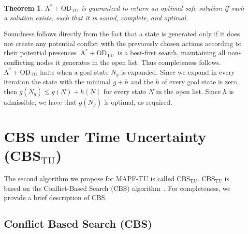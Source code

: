 \documentclass[jair,twoside,11pt,theapa]{article}
\newcommand{\odatu}{$\mathrm{A^{*}+OD_{TU}}$\xspace}
\newcommand{\cbstu}{CBS$\mathrm{_{TU}}$\xspace}
\newcommand{\mapftu}{MAPF-TU\xspace}
\newtheorem{theorem}{Theorem}
\newenvironment{proofo}{\renewcommand{\proofname}{Proof outline}\proof}{\endproof}
\begin{document}
\begin{theorem}
\odatu is guaranteed to return an optimal safe solution if such a solution exists, such that it is sound, complete, and optimal. 
\label{the:aod}
\end{theorem}
\begin{proofo}
Soundness follows directly from the fact that a state is generated only if it does not create any potential conflict with the previously chosen actions according to their potential presences. 
\odatu\ is a best-first search, maintaining all non-conflicting nodes it generates in the open list. Thus completeness follows.
\odatu halts when a goal state $N_g$ is expanded. 
Since we expand in every iteration the state with the minimal $g+h$ and 
the $h$ of every goal state is zero, 
then $g(N_g)\leq g(N)+h(N)$ for every state $N$ in the open list. 
Since $h$ is admissible, 
we have that $g(N_g)$ is optimal, as required. %
\end{proofo}


\section{CBS under Time Uncertainty (\cbstu)}
\label{cbstu}

The second algorithm we propose for \mapftu is called \cbstu. 
\cbstu is based on the Conflict-Based Search (CBS) algorithm~. 
For completeness, we provide a brief description of CBS. 


\subsection{Conflict Based Search (CBS)}
\end{document}
